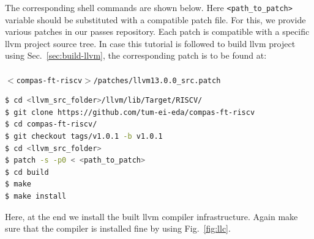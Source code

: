 The corresponding shell commands are shown below. Here \texttt{<path\_to\_patch>} variable should be substituted
with a compatible patch file. For this, we provide various patches in our passes repository.
Each patch is compatible with a specific llvm project source tree.
In case this tutorial is followed to build llvm project using Sec.~\ref{sec:build-llvm},
the corresponding patch is to be found at:\\\\
\texttt{$<$compas-ft-riscv$>$/patches/llvm13.0.0\_src.patch}

\begin{framed}
 \begin{lstlisting}[language=bash, basicstyle=\small\ttfamily]
$ cd <llvm_src_folder>/llvm/lib/Target/RISCV/
$ git clone https://github.com/tum-ei-eda/compas-ft-riscv
$ cd compas-ft-riscv/
$ git checkout tags/v1.0.1 -b v1.0.1
$ cd <llvm_src_folder>
$ patch -s -p0 < <path_to_patch>
$ cd build
$ make
$ make install
\end{lstlisting}
\end{framed}

Here, at the end we install the built llvm compiler infrastructure. Again make sure that the compiler is installed fine
by using Fig.~\ref{fig:llc}.
